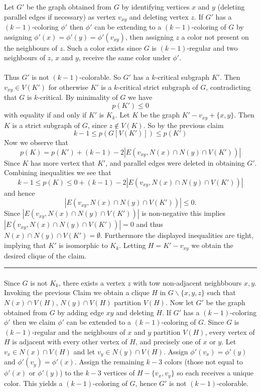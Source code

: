 \documentclass[letterpaper,12pt,oneside,onecolumn]{article}
\newenvironment{proof}{{\bf Proof:  }}{\hfill\rule{2mm}{2mm}}
\begin{document}
\begin{proof}
Let $G'$ be the graph obtained from $G$ by identifying vertices $x$ and $y$ (deleting parallel edges if necessary) as vertex $v_{xy}$ and deleting vertex $z$. If $G'$ has a $(k-1)$-coloring $\phi'$ then $\phi'$ can be extending to a $(k-1)$-coloring of $G$ by assigning $\phi'(x ) = \phi'(y) = \phi'(v_{xy})$, then assigning $z$ a color not present on the neighbours of $z$. Such a color exists since $G$ is $(k-1)$-regular and two neighbours of $z$, $x$ and $y$, receive the same color under $\phi'$.
\paragraph{}
Thus $G'$ is not $(k-1)$-colorable. So $G'$ has a $k$-critical subgraph $K'$. Then $v_{xy} \in V(K')$ for otherwise $K'$ is a $k$-critical strict subgraph of $G$, contradicting that $G$ is $k$-critical. By minimality of $G$ we have
$$p(K') \leq 0$$
with equality if and only if $K'$ is $K_k$. Let $K$ be the graph $K' - v_{xy} + \{x,y\}$. Then $K$ is a strict subgraph of $G$, since $z \not\in V(K)$. So by the previous claim
$$k-1 \leq p(G[V(K')]) \leq p(K')$$
Now we observe that
$$p(K) = p(K') + (k-1) - 2|E(v_{xy}, N(x) \cap N(y) \cap V(K'))|$$
Since $K$ has more vertex that $K'$, and parallel edges were deleted in obtaining $G'$. Combining inequalities we see that
$$k-1 \leq p(K) \leq 0 + (k-1) - 2|E(v_{xy}, N(x) \cap N(y) \cap V(K'))|$$
and hence 
$$|E(v_{xy}, N(x) \cap N(y) \cap V(K'))| \leq 0.$$
Since $|E(v_{xy}, N(x) \cap N(y) \cap V(K'))|$ is non-negative this implies $|E(v_{xy}, N(x) \cap N(y) \cap V(K'))| = 0$ and thus
$N(x)\cap N(y) \cap V(K') = \emptyset$. Furthermore the displayed inequalities are tight, implying that $K'$ is isomorphic to $K_k$. Letting $H = K'-v_{xy}$ we obtain the desired clique of the claim.
\end{proof}
\paragraph{}
Since $G$ is not $K_k$, there exists a vertex $z$ with tow non-adjacent neighbbours $x,y$. Invoking the previous Claim we obtain a clique $H$ in $G\backslash\{x,y,z\}$ such that $N(x) \cap V(H)$, $N(y) \cap V(H)$ partition $V(H)$. Now let $G'$ be the graph obtained from $G$ by adding edge $xy$ and deleting $H$. If $G'$ has a $(k-1)$-coloring $\phi'$ then we claim $\phi'$ can be extended to a $(k-1)$-coloring of $G$. Since $G$ is $(k-1)$-regular and the neighbours of $x$ and $y$ partition $V(H)$, every vertex of $H$ is adjacent with every other vertex of $H$, and precisely one of $x$ or $y$. Let $v_x \in N(x) \cap V(H)$ and let $v_y \in N(y) \cap V(H)$. Assign $\phi'(v_x) = \phi'(y)$ and $\phi'(v_y) = \phi'(x)$. Assign the remaining $k-3$ colors (those not equal to $\phi'(x)$ or $\phi'(y)$) to the $k-3$ vertices of $H - \{v_x, v_y\}$ so each receives a unique color. This yields a $(k-1)$-coloring of $G$, hence $G'$ is not $(k-1)$-colorable.
\end{document}
